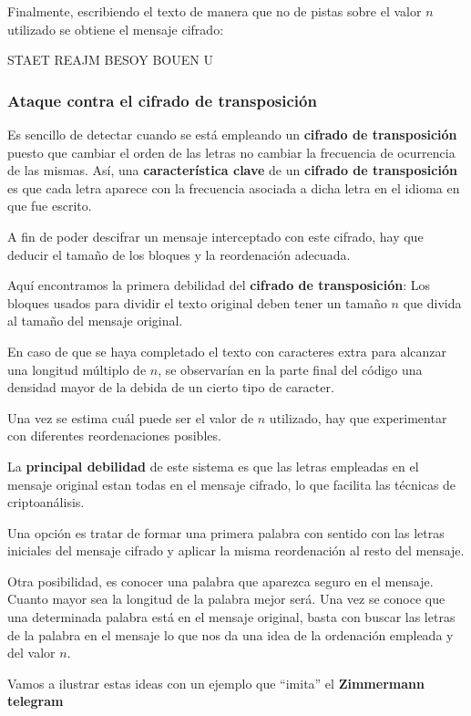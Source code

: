 \documentclass[nochap]{apuntesURJC}
\begin{document}
Finalmente, escribiendo el texto de manera que no de pistas sobre el valor $n$ utilizado se obtiene el mensaje cifrado:

\begin{center}
STAET REAJM BESOY BOUEN U
\end{center}

\subsubsection{Ataque contra el cifrado de transposición}
Es sencillo de detectar cuando se está empleando un \textbf{cifrado de transposición} puesto que cambiar el orden de las letras no cambiar la frecuencia de ocurrencia de las mismas. Así, una \textbf{característica clave} de un \textbf{cifrado de transposición} es que cada letra aparece con la frecuencia asociada a dicha letra en el idioma en que fue escrito.

A fin de poder descifrar un mensaje interceptado con este cifrado, hay que deducir el tamaño de los bloques y la reordenación adecuada.

Aquí encontramos la primera debilidad del \textbf{cifrado de transposición}: Los bloques usados para dividir el texto original deben tener un tamaño $n$ que divida al tamaño del mensaje original.

En caso de que se haya completado el texto con caracteres extra para alcanzar una longitud múltiplo de $n$, se observarían en la parte final del código una densidad mayor de la debida de un cierto tipo de caracter.

Una vez se estima cuál puede ser el valor de $n$ utilizado, hay que experimentar con diferentes reordenaciones posibles.

La \textbf{principal debilidad} de este sistema es que las letras empleadas en el mensaje original estan todas en el mensaje cifrado, lo que facilita las técnicas de criptoanálisis.

Una opción es tratar de formar una primera palabra con sentido con las letras iniciales del mensaje cifrado y aplicar la misma reordenación al resto del mensaje.

Otra posibilidad, es conocer una palabra que aparezca seguro en el mensaje. Cuanto mayor sea la longitud de la palabra mejor será. Una vez se conoce que una determinada palabra está en el mensaje original, basta con buscar las letras de la palabra en el mensaje lo que nos da una idea de la ordenación empleada y del valor $n$.

Vamos a ilustrar estas ideas con un ejemplo que ``imita'' el \textbf{Zimmermann telegram}%
\end{document}
